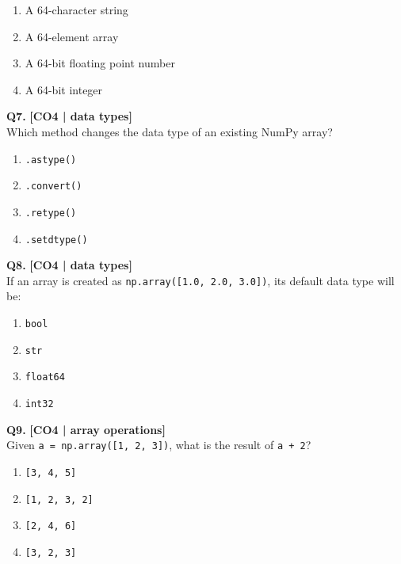 \begin{enumerate}[label=(\alph*),topsep=2pt,itemsep=1pt,partopsep=0pt,parsep=0pt]
    \item \relax A 64-character string
    \item \relax A 64-element array
    \item \relax A 64-bit floating point number
    \item \relax A 64-bit integer
\end{enumerate}
\vspace{{2mm}}

\noindent\textbf{Q7.} \hfill {\small\color{LPUOrange}\textbf{[CO4 | data types]}}\\[2pt]
Which method changes the data type of an existing NumPy array?

\begin{enumerate}[label=(\alph*),topsep=2pt,itemsep=1pt,partopsep=0pt,parsep=0pt]
    \item \relax \texttt{.astype()}
    \item \relax \texttt{.convert()}
    \item \relax \texttt{.retype()}
    \item \relax \texttt{.setdtype()}
\end{enumerate}
\vspace{{2mm}}

\noindent\textbf{Q8.} \hfill {\small\color{LPUOrange}\textbf{[CO4 | data types]}}\\[2pt]
If an array is created as \texttt{np.array([1.0, 2.0, 3.0])}, its default data type will be:

\begin{enumerate}[label=(\alph*),topsep=2pt,itemsep=1pt,partopsep=0pt,parsep=0pt]
    \item \relax \texttt{bool}
    \item \relax \texttt{str}
    \item \relax \texttt{float64}
    \item \relax \texttt{int32}
\end{enumerate}
\vspace{{2mm}}

\noindent\textbf{Q9.} \hfill {\small\color{LPUOrange}\textbf{[CO4 | array operations]}}\\[2pt]
Given \texttt{a = np.array([1, 2, 3])}, what is the result of \texttt{a + 2}?

\begin{enumerate}[label=(\alph*),topsep=2pt,itemsep=1pt,partopsep=0pt,parsep=0pt]
    \item \relax \texttt{[3, 4, 5]}
    \item \relax \texttt{[1, 2, 3, 2]}
    \item \relax \texttt{[2, 4, 6]}
    \item \relax \texttt{[3, 2, 3]}
\end{enumerate}
\vspace{{2mm}}

